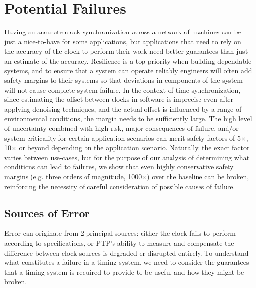 \newcommand{\safetyMargin}{1000$\times$}

\section{Potential Failures}

Having an accurate clock synchronization across a network of machines can be just a nice-to-have for some applications, but applications that need to rely on the accuracy of the clock to perform their work need better guarantees than just an estimate of the accuracy.
Resilience is a top priority when building dependable systems, and to ensure that a system can operate reliably engineers will often add safety margins to their systems so that deviations in components of the system will not cause complete system failure.
In the context of time synchronization, since estimating the offset between clocks in software is imprecise even after applying denoising techniques, and the actual offset is influenced by a range of environmental conditions, the margin needs to be sufficiently large.
The high level of uncertainty combined with high risk, major consequences of failure, and/or system criticality for certain application scenarios can merit safety factors of 5$\times$, 10$\times$ or beyond depending on the application scenario.
Naturally, the exact factor varies between use-cases, but for the purpose of our analysis of determining what conditions can lead to failures, we show that even highly conservative safety margins (e.g. three orders of magnitude, \safetyMargin) over the baseline can be broken, reinforcing the necessity of careful consideration of possible causes of failure.

\subsection{Sources of Error}

Error can originate from 2 principal sources: either the clock fails to perform according to specifications, or PTP's ability to measure and compensate the difference between clock sources is degraded or disrupted entirely. To understand what constitutes a failure in a timing system, we need to consider the guarantees that a timing system is required to provide to be useful and how they might be broken.

